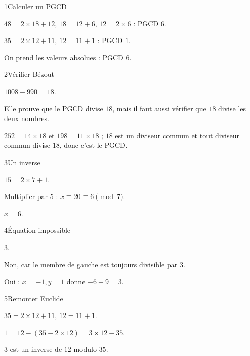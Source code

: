 \begin{corrige}{1}{Calculer un PGCD}
\begin{questions}
\item $48=2\times18+12$, $18=12+6$, $12=2\times6$ : PGCD $6$.
\item $35=2\times12+11$, $12=11+1$ : PGCD $1$.
\item On prend les valeurs absolues : PGCD $6$.
\end{questions}
\end{corrige}
\begin{corrige}{2}{Vérifier Bézout}
\begin{questions}
\item $1008-990=18$.
\item Elle prouve que le PGCD divise $18$, mais il faut aussi vérifier que $18$ divise les deux nombres.
\item $252=14\times18$ et $198=11\times18$ ; $18$ est un diviseur commun et tout diviseur commun divise $18$, donc c’est le PGCD.
\end{questions}
\end{corrige}
\begin{corrige}{3}{Un inverse}
\begin{questions}
\item $15=2\times7+1$.
\item Multiplier par $5$ : $x\equiv20\equiv6\pmod7$.
\item $x=6$.
\end{questions}
\end{corrige}
\begin{corrige}{4}{Équation impossible}
\begin{questions}
\item $3$.
\item Non, car le membre de gauche est toujours divisible par $3$.
\item Oui : $x=-1,y=1$ donne $-6+9=3$.
\end{questions}
\end{corrige}
\begin{corrige}{5}{Remonter Euclide}
\begin{questions}
\item $35=2\times12+11$, $12=11+1$.
\item $1=12-(35-2\times12)=3\times12-35$.
\item $3$ est un inverse de $12$ modulo $35$.
\end{questions}
\end{corrige}
